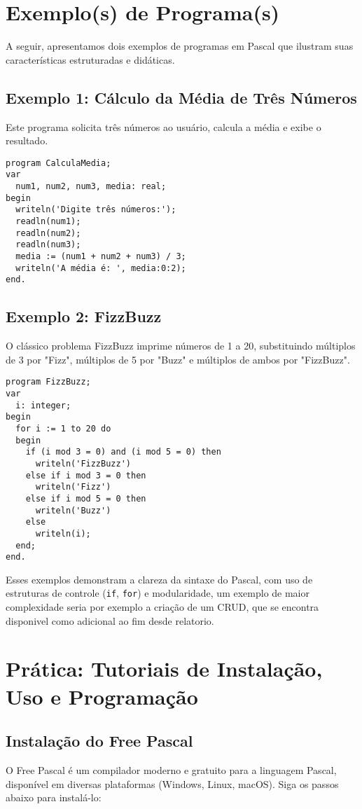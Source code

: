 \documentclass[12pt,a4paper,oneside]{abntex2}
\begin{document}
\chapter{Exemplo(s) de Programa(s)}
A seguir, apresentamos dois exemplos de programas em Pascal que ilustram suas características estruturadas e didáticas.

\section{Exemplo 1: Cálculo da Média de Três Números}
Este programa solicita três números ao usuário, calcula a média e exibe o resultado.

\begin{verbatim}
program CalculaMedia;
var
  num1, num2, num3, media: real;
begin
  writeln('Digite três números:');
  readln(num1);
  readln(num2);
  readln(num3);
  media := (num1 + num2 + num3) / 3;
  writeln('A média é: ', media:0:2);
end.
\end{verbatim}

\section{Exemplo 2: FizzBuzz}
O clássico problema FizzBuzz imprime números de 1 a 20, substituindo múltiplos de 3 por "Fizz", múltiplos de 5 por "Buzz" e múltiplos de ambos por "FizzBuzz".

\begin{verbatim}
program FizzBuzz;
var
  i: integer;
begin
  for i := 1 to 20 do
  begin
    if (i mod 3 = 0) and (i mod 5 = 0) then
      writeln('FizzBuzz')
    else if i mod 3 = 0 then
      writeln('Fizz')
    else if i mod 5 = 0 then
      writeln('Buzz')
    else
      writeln(i);
  end;
end.
\end{verbatim}

Esses exemplos demonstram a clareza da sintaxe do Pascal, com uso de estruturas de controle (\texttt{if}, \texttt{for}) e modularidade, um exemplo de maior complexidade seria por exemplo a criação de um CRUD, que se encontra disponivel como adicional ao fim desde relatorio.

\chapter{Prática: Tutoriais de Instalação, Uso e Programação}
\section{Instalação do Free Pascal}
O Free Pascal é um compilador moderno e gratuito para a linguagem Pascal, disponível em diversas plataformas (Windows, Linux, macOS). Siga os passos abaixo para instalá-lo:
\end{document}
